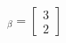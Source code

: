 \documentclass[preview]{standalone}
\begin{document}
\begin{align*}
[\vec{b}]_{\beta}  = \begin{bmatrix} 3 \\ 2 \end{bmatrix}
\end{align*}
\end{document}
